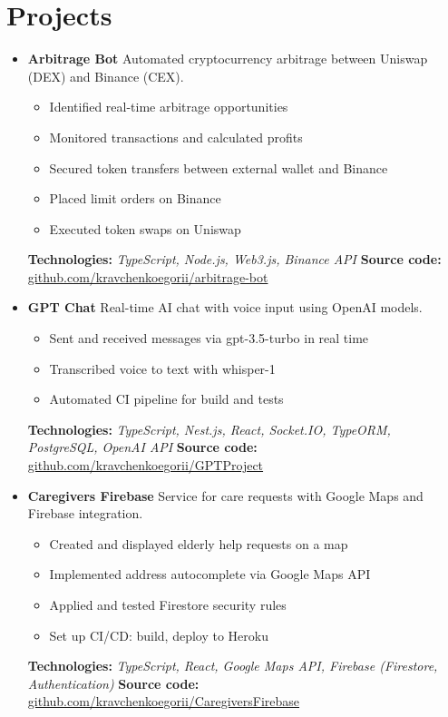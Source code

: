 \section{Projects}\label{sec:projects}
\begin{itemize}[noitemsep]
    \item \textbf{Arbitrage Bot}
    Automated cryptocurrency arbitrage between Uniswap (DEX) and Binance (CEX).
    \begin{itemize}[noitemsep]
        \item Identified real-time arbitrage opportunities
        \item Monitored transactions and calculated profits
        \item Secured token transfers between external wallet and Binance
        \item Placed limit orders on Binance
        \item Executed token swaps on Uniswap
    \end{itemize}
    \textbf{Technologies:} \textit{TypeScript, Node.js, Web3.js, Binance API}
    \textbf{Source code:} \href{https://github.com/kravchenkoegorii/arbitrage-bot}{github.com/kravchenkoegorii/arbitrage-bot}

    \item \textbf{GPT Chat}
    Real-time AI chat with voice input using OpenAI models.
    \begin{itemize}[noitemsep]
        \item Sent and received messages via gpt-3.5-turbo in real time
        \item Transcribed voice to text with whisper-1
        \item Automated CI pipeline for build and tests
    \end{itemize}
    \textbf{Technologies:} \textit{TypeScript, Nest.js, React, Socket.IO, TypeORM, PostgreSQL, OpenAI API}
    \textbf{Source code:} \href{https://github.com/kravchenkoegorii/GPTProject}{github.com/kravchenkoegorii/GPTProject}

    \item \textbf{Caregivers Firebase}
    Service for care requests with Google Maps and Firebase integration.
    \begin{itemize}[noitemsep]
        \item Created and displayed elderly help requests on a map
        \item Implemented address autocomplete via Google Maps API
        \item Applied and tested Firestore security rules
        \item Set up CI/CD: build, deploy to Heroku
    \end{itemize}
    \textbf{Technologies:} \textit{TypeScript, React, Google Maps API, Firebase (Firestore, Authentication)}
    \textbf{Source code:} \href{https://github.com/kravchenkoegorii/CaregiversFirebase}{github.com/kravchenkoegorii/CaregiversFirebase}
\end{itemize}
